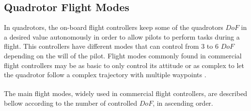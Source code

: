 \subsection{Quadrotor Flight Modes}
In quadrotors, the on-board flight controllers keep some of the quadrotors $DoF$ in a desired value autonomously in order to allow pilots to perform tasks during a flight. This controllers have different modes that can control from $3$ to $6$ $DoF$ depending on the will of the pilot. Flight modes commonly found in commercial flight controllers may be as basic to only control its attitude or as complex to let the quadrotor follow a complex trajectory with multiple waypoints \cite{Ardupilot2016}.
\\\\
The main flight modes, widely used in commercial flight controllers, are described bellow according to the number of controlled $DoF$, in ascending order.

